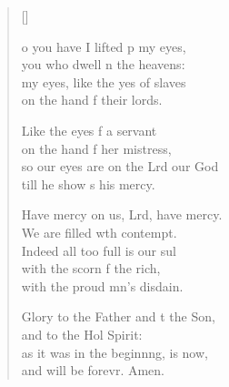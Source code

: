 \settowidth{\versewidth}{so our eyes are on the Lord our God *}
\begin{verse}[\versewidth]
  \begin{patverse}
o you have I lifted p my eyes,\Med\\
you who dwell \pointup{\i}n the heavens:\\
my eyes, like the yes of slaves\Med\\
on the hand f their lords.

Like the eyes f a servant\Med\\
on the hand f her mistress,\\
so our eyes are on the Lrd our God\Med\\
till he show s his mercy.

Have mercy on us, Lrd, have mercy.\Med\\
We are filled w\pointup{\i}th contempt.\\
Indeed all too full is our sul\Flex\\
with the scorn f the rich,\Med\\
with the proud mn’s disdain.

Glory to the Father and t the Son,\Med\\
and to the Hol Spirit:\\
as it was in the beginn\pointup{\i}ng, is now,\Med\\
and will be forevr. Amen. 
  \end{patverse}
\end{verse}
